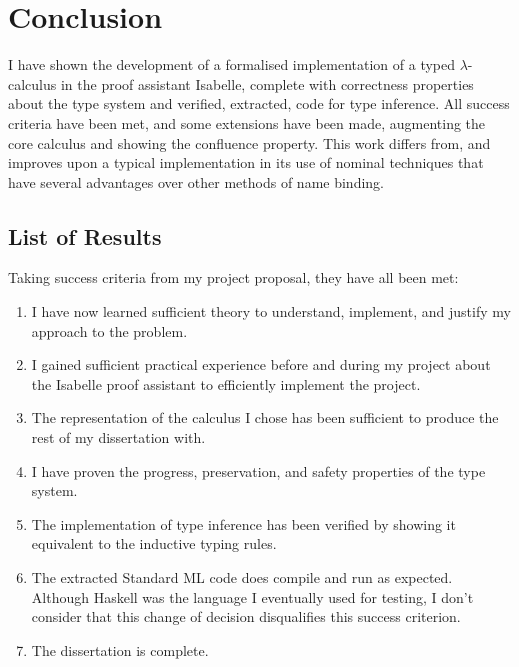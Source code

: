 \chapter{Conclusion}
I have shown the development of a formalised implementation of a typed \(\lambda\)-calculus in the proof assistant Isabelle, complete with correctness properties about the type system and verified, extracted, code for type inference.
All success criteria have been met, and some extensions have been made, augmenting the core calculus and showing the confluence property.
This work differs from, and improves upon a typical implementation in its use of nominal techniques that have several advantages over other methods of name binding.

\section{List of Results}
Taking success criteria from my project proposal, they have all been met:
\begin{enumerate}
\item
I have now learned sufficient theory to understand, implement, and justify my approach to the problem.
\item
I gained sufficient practical experience before and during my project about the Isabelle proof assistant to efficiently implement the project.
\item
The representation of the calculus I chose has been sufficient to produce the rest of my dissertation with.
\item
I have proven the progress, preservation, and safety properties of the type system.
\item
The implementation of type inference has been verified by showing it equivalent to the inductive typing rules.
\item
The extracted Standard ML code does compile and run as expected.
Although Haskell was the language I eventually used for testing, I don't consider that this change of decision disqualifies this success criterion.
\item
The dissertation is complete.
\end{enumerate}

